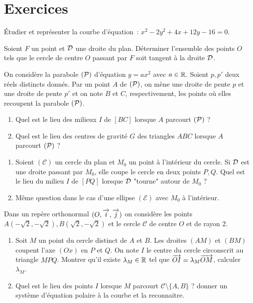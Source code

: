 \section{Exercices}
\begin{exercice}
    Étudier et représenter la courbe d'équation~: \(x^2-2y^2+4x+12y-16=0\).
\end{exercice}
\begin{exercice}
    Soient \(F\) un point et \(\Dr\) une droite du plan. Déterminer l'ensemble des points \(O\) tels que le cercle de centre \(O\) passant par \(F\) soit tangent à la droite \(\Dr\).
\end{exercice}
\begin{exercice}
    On considère la parabole \((\P)\) d'équation \(y=ax^2\) avec \(a \in \R\). Soient \(p, p'\) deux réels distincts donnés. Par un point \(A\) de \((\P)\), on mène une droite de pente \(p\) et une droite de pente \(p'\) et on note \(B\) et \(C\), respectivement, les points où elles recoupent la parabole \((\P)\).
    \begin{enumerate}
        \item Quel est le lieu des milieux \(I\) de \([BC]\) lorsque \(A\) parcourt \((\P)\) ?
        \item Quel est le lieu des centres de gravité \(G\) des triangles \(ABC\) lorsque \(A\) parcourt \((\P)\) ?
    \end{enumerate}
\end{exercice}
\begin{exercice}
    \begin{enumerate}
        \item Soient \((\mathcal{C})\) un cercle du plan et \(M_0\) un point à l'intérieur du cercle. Si \(\Dr\) est une droite passant par \(M_0\), elle coupe le cercle en deux points \(P, Q\). Quel est le lieu du milieu \(I\) de \([PQ]\) lorsque \(\Dr\) "tourne" autour de \(M_0\) ?
        \item Même question dans le cas d'une ellipse \((\mathcal{E})\) avec \(M_0\) à l'intérieur.
    \end{enumerate}
\end{exercice}
\begin{exercice}
    Dans un repère orthonormal \((O, \vi, \vj)\) on considère les points \(A(-\sqrt{2}, -\sqrt{2}), B(\sqrt{2}, -\sqrt{2})\) et le cercle \(\mathcal{C}\) de centre \(O\) et de rayon \(2\).
    \begin{enumerate}
        \item Soit \(M\) un point du cercle distinct de \(A\) et \(B\). Les droites \((AM)\) et \((BM)\) coupent l'axe \((Ox)\) en \(P\) et \(Q\). On note \(I\) le centre du cercle circonscrit au triangle \(MPQ\). Montrer qu'il existe \(\lambda_M \in \R\) tel que \(\vect{OI} = \lambda_M \vect{OM}\), calculer \(\lambda_M\).
        \item Quel est le lieu des points \(I\) lorsque \(M\) parcourt \(\mathcal{C}\setminus\{A, B\}\) ? donner un système d'équation polaire à la courbe et la reconnaitre.
    \end{enumerate}
\end{exercice}
